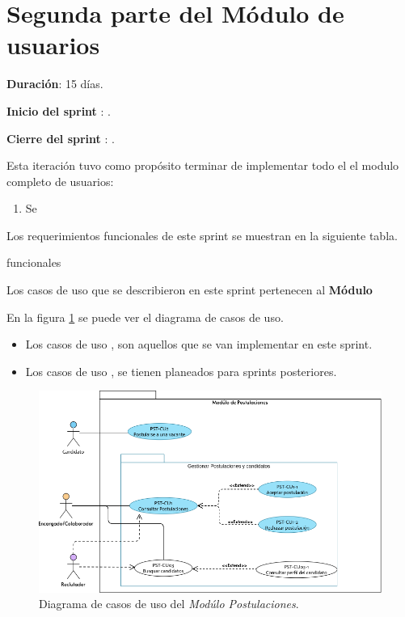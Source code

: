 \clearpage
\section{Segunda parte del Módulo de usuarios}
    \begin{description}
        \item \textbf{Duración}: 15 días.
        \item \textbf{Inicio del sprint }: .
        \item \textbf{Cierre del sprint }: .
    \end{description}

Esta iteración tuvo como propósito terminar de implementar todo el el modulo completo de usuarios:
\begin{enumerate}
    \item Se 
\end{enumerate} 

Los requerimientos funcionales de este sprint se muestran en la siguiente tabla.
\begin{requerimientos}{funcionales}
    \RFitem{}{}{}
\end{requerimientos}

Los casos de uso que se describieron en este sprint pertenecen al \textbf{Módulo } 

En la figura \ref{dcu:DCUPST} se puede ver el diagrama de casos de uso.
\begin{itemize}
    \item Los casos de uso \IUazul{} , son aquellos que se van implementar en este sprint.
    \item Los casos de uso \IUblanco{}, se tienen planeados para sprints posteriores.
\end{itemize} 

\begin{figure}[H]
    \begin{center}
        \includegraphics[width=.7\textwidth]{sprints/imagenes/DCUPST.png}
    \end{center}
    \caption{Diagrama de casos de uso del \textit{Modúlo Postulaciones}.}
    \label{dcu:DCUPST}
\end{figure}

